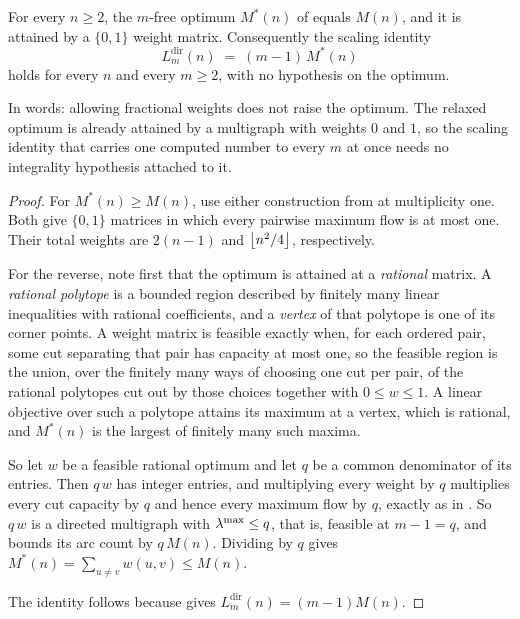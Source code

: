 \begin{corollary}\label{cor:mstar-integral}
For every $n \ge 2$, the $m$-free optimum $M^{*}(n)$ of  equals $M(n)$, and it is attained by a $\{0,1\}$ weight matrix. Consequently the scaling identity
\[
    L_m^{\mathrm{dir}}(n) \;=\; (m-1)\,M^{*}(n)
\]
holds for every $n$ and every $m \ge 2$, with no hypothesis on the optimum.
\end{corollary}

In words: allowing fractional weights does not raise the optimum. The relaxed optimum is already attained by a multigraph with weights $0$ and $1$, so the scaling identity that carries one computed number to every $m$ at once needs no integrality hypothesis attached to it.

\begin{proof}
For $M^{*}(n) \ge M(n)$, use either construction from
 at multiplicity one. Both give $\{0,1\}$
matrices in which every pairwise maximum flow is at most one. Their total
weights are $2(n-1)$ and $\left\lfloor n^2/4 \right\rfloor$, respectively.

For the reverse, note first that the optimum is attained at a \emph{rational}
matrix. A \emph{rational polytope} is a bounded region described by finitely
many linear inequalities with rational coefficients, and a \emph{vertex} of
that polytope is one of its corner points. A weight matrix is feasible exactly
when, for each ordered pair, some cut separating that pair has capacity at most
one, so the feasible region is the union, over the finitely many ways of
choosing one cut per pair, of the rational polytopes cut out by those choices
together with $0 \le w \le 1$. A linear objective over such a polytope attains
its maximum at a vertex, which is rational, and $M^{*}(n)$ is the largest of
finitely many such maxima.

So let $w$ be a feasible rational optimum and let $q$ be a common denominator of its entries. Then $q\,w$ has integer entries, and multiplying every weight by $q$ multiplies every cut capacity by $q$ and hence every maximum flow by $q$, exactly as in . So $q\,w$ is a directed multigraph with $\lambda^{\max} \le q$, that is, feasible at $m - 1 = q$, and  bounds its arc count by $q\,M(n)$. Dividing by $q$ gives $M^{*}(n) = \sum_{u \ne v} w(u,v) \le M(n)$.

The identity follows because  gives $L_m^{\mathrm{dir}}(n) = (m-1)M(n)$.
\end{proof}

